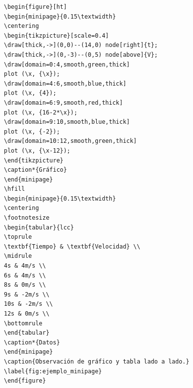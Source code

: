 \begin{verbatim}
\begin{figure}[ht]
\begin{minipage}{0.15\textwidth}
\centering
\begin{tikzpicture}[scale=0.4]
\draw[thick,->](0,0)--(14,0) node[right]{t};
\draw[thick,->](0,-3)--(0,5) node[above]{V};
\draw[domain=0:4,smooth,green,thick] 
plot (\x, {\x});
\draw[domain=4:6,smooth,blue,thick] 
plot (\x, {4});
\draw[domain=6:9,smooth,red,thick] 
plot (\x, {16-2*\x});
\draw[domain=9:10,smooth,blue,thick] 
plot (\x, {-2});
\draw[domain=10:12,smooth,green,thick] 
plot (\x, {\x-12});
\end{tikzpicture}
\caption*{Gráfico}
\end{minipage}
\hfill
\begin{minipage}{0.15\textwidth}
\centering
\footnotesize
\begin{tabular}{lcc}
\toprule
\textbf{Tiempo} & \textbf{Velocidad} \\
\midrule
4s & 4m/s \\
6s & 4m/s \\
8s & 0m/s \\
9s & -2m/s \\
10s & -2m/s \\
12s & 0m/s \\
\bottomrule
\end{tabular}
\caption*{Datos}
\end{minipage}
\caption{Observación de gráfico y tabla lado a lado.}
\label{fig:ejemplo_minipage}
\end{figure}
\end{verbatim}
